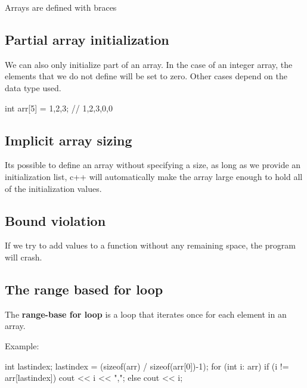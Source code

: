 \documentclass{report}
\begin{document}
    \bigbreak \noindent 
    \begin{notebox}
			Arrays are defined with braces
		\end{notebox}
    \bigbreak \noindent 

   \bigbreak \noindent 
   \subsection{Partial array initialization}
   \bigbreak \noindent 
   We can also only initialize part of an array. In the case of an integer array, the elements that we do not define will be set to zero. Other cases depend on the data type used.
   \bigbreak \noindent 
   
   \begin{cppcode}
int arr[5] = {1,2,3}; // {1,2,3,0,0}
   \end{cppcode}
   

   \bigbreak \noindent 
   \subsection{Implicit array sizing}
   \bigbreak \noindent 
   Its possible to define an array without specifying a size, as long as we provide an initialization list, c++ will automatically make the array large enough to hold all of the initialization values.

   \bigbreak \noindent 
   \subsection{Bound violation}
   \bigbreak \noindent 
   If we try to add values to a function without any remaining space, the program will crash.

   \pagebreak
   \subsection{The range based for loop}
   \bigbreak \noindent 
   \begin{concept}
 The \textbf{range-base for loop} is a loop that iterates once for each element in an array.
	\end{concept}
   \bigbreak \noindent 
   Example:
   \bigbreak \noindent 
   
    \begin{cppcode}
int lastindex;
lastindex = (sizeof(arr) / sizeof(arr[0])-1);
for (int i: arr)  {
    if (i != arr[lastindex]) {
        cout << i << ",";
    } else {
        cout << i;
    }
}
   \end{cppcode}
   
\end{document}
